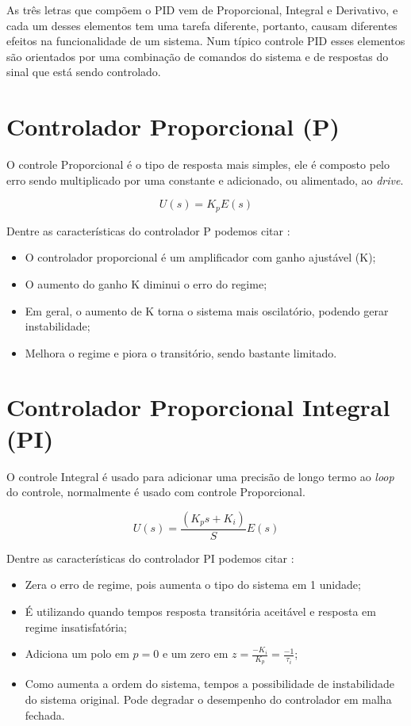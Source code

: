 \documentclass[
	12pt,				%
	openany,			%
	oneside,			%
	a4paper,			%
	english,			%
	french,				%
	spanish,			%
	brazil,				%
	]{abntex2}
\begin{document}
{As três letras que compõem o PID vem de Proporcional, Integral e Derivativo, e cada um desses elementos tem uma tarefa diferente, portanto, causam diferentes efeitos na funcionalidade de um sistema. Num típico controle PID esses elementos são orientados por uma combinação de comandos do sistema e de respostas do sinal que está sendo controlado.


\section{Controlador Proporcional (P)}

O controle Proporcional é o tipo de resposta mais simples, ele é composto pelo erro sendo multiplicado por uma constante e adicionado, ou alimentado, ao \textit{drive}.

\begin{equation}
U(s) = K_pE(s)
\end{equation}

Dentre as características do controlador P podemos citar \cite{meneghetti1}:

\begin{itemize}
    \item O controlador proporcional é um amplificador com ganho ajustável (K);
    \item O aumento do ganho K diminui o erro do regime;
    \item Em geral, o aumento de K torna o sistema mais oscilatório, podendo gerar instabilidade;
    \item Melhora o regime e piora o transitório, sendo bastante limitado.
\end{itemize}


\section{Controlador Proporcional Integral (PI)}

O controle Integral é usado para adicionar uma precisão de longo termo ao \textit{loop} do controle, normalmente é usado com controle Proporcional. 

\begin{equation}
U(s) = \frac{(K_ps+K_i)}{S}E(s)
\end{equation}

Dentre as características do controlador PI podemos citar \cite{meneghetti1}:
\begin{itemize}
    \item Zera o erro de regime, pois aumenta o tipo do sistema em 1 unidade;
    \item É utilizando quando tempos resposta transitória aceitável e resposta em regime insatisfatória;
    \item Adiciona um polo em $p=0$ e um zero em $z = \frac{-K_i}{K_p} = \frac{-1}{\tau_i}$;
    \item Como aumenta a ordem do sistema, tempos a possibilidade de instabilidade do sistema original. Pode degradar o desempenho do controlador em malha fechada.
\end{itemize}

}
\end{document}
